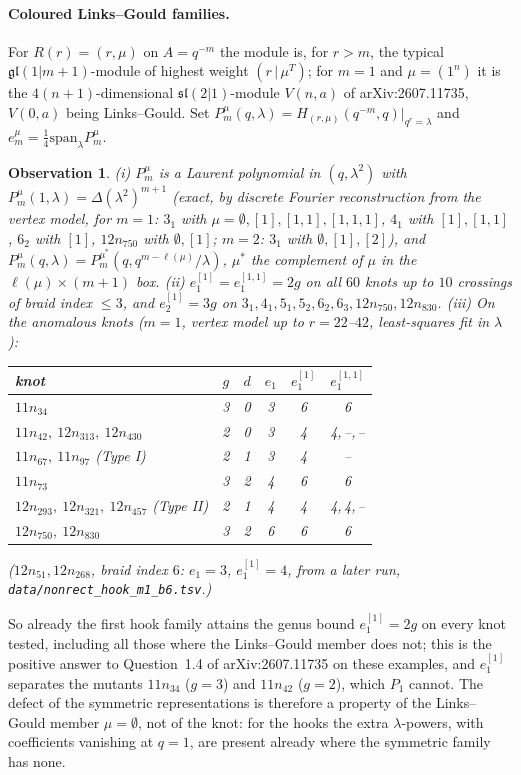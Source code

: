 \documentclass[11pt]{article}
\newtheorem{observation}{Observation}
\theoremstyle{definition}
\theoremstyle{remark}
\begin{document}
\paragraph{Coloured Links--Gould families.}  For $R(r)=(r,\mu)$ on $A=q^{-m}$ the module is, for $r>m$, the typical
$\mathfrak{gl}(1|m+1)$-module of highest weight $(r\,|\,\mu^T)$; for $m=1$ and $\mu=(1^n)$ it is the
$4(n+1)$-dimensional $\mathfrak{sl}(2|1)$-module $V(n,a)$ of arXiv:2607.11735, $V(0,a)$ being Links--Gould.  Set
$P^\mu_m(q,\lambda)=H_{(r,\mu)}(q^{-m},q)|_{q^r=\lambda}$ and $e^\mu_m=\frac14\mathrm{span}_\lambda P^\mu_m$.
\begin{observation}\label{obs:hooks}
(i) $P^\mu_m$ is a Laurent polynomial in $(q,\lambda^2)$ with $P^\mu_m(1,\lambda)=\Delta(\lambda^2)^{m+1}$
(exact, by discrete Fourier reconstruction from the vertex model, for $m=1$: $3_1$ with $\mu=\emptyset,[1],[1,1],[1,1,1]$,
$4_1$ with $[1],[1,1]$, $6_2$ with $[1]$, $12n_{750}$ with $\emptyset,[1]$; $m=2$: $3_1$ with $\emptyset,[1],[2]$),
and $P^\mu_m(q,\lambda)=P^{\mu^*}_m(q,q^{m-\ell(\mu)}/\lambda)$, $\mu^*$ the complement of $\mu$ in the
$\ell(\mu)\times(m+1)$ box.
(ii) $e^{[1]}_1=e^{[1,1]}_1=2g$ on all $60$ knots up to $10$ crossings of braid index $\le3$, and $e^{[1]}_2=3g$ on
$3_1,4_1,5_1,5_2,6_2,6_3,12n_{750},12n_{830}$.
(iii) On the anomalous knots ($m=1$, vertex model up to $r=22$--$42$, least-squares fit in $\lambda$):
\begin{center}
\begin{tabular}{lccccc}
\toprule
knot & $g$ & $d$ & $e_1$ & $e^{[1]}_1$ & $e^{[1,1]}_1$\\
\midrule
$11n_{34}$ & 3 & 0 & 3 & 6 & 6\\
$11n_{42},\ 12n_{313},\ 12n_{430}$ & 2 & 0 & 3 & 4 & 4,\,--,\,--\\
$11n_{67},\ 11n_{97}$ (Type I) & 2 & 1 & 3 & 4 & --\\
$11n_{73}$ & 3 & 2 & 4 & 6 & 6\\
$12n_{293},\ 12n_{321},\ 12n_{457}$ (Type II) & 2 & 1 & 4 & 4 & 4,\,4,\,--\\
$12n_{750},\ 12n_{830}$ & 3 & 2 & 6 & 6 & 6\\
\bottomrule
\end{tabular}
\end{center}
($12n_{51},12n_{268}$, braid index $6$: $e_1=3$, $e^{[1]}_1=4$, from a later run, \texttt{data/nonrect\_hook\_m1\_b6.tsv}.)
\end{observation}
So already the first hook family attains the genus bound $e^{[1]}_1=2g$ on every knot tested, including all those
where the Links--Gould member does not; this is the positive answer to Question~1.4 of arXiv:2607.11735 on these
examples, and $e^{[1]}_1$ separates the mutants $11n_{34}$ ($g=3$) and $11n_{42}$ ($g=2$), which $P_1$ cannot.
The defect of the symmetric representations is therefore a property of the Links--Gould member $\mu=\emptyset$,
not of the knot: for the hooks the extra $\lambda$-powers, with coefficients vanishing at $q=1$, are present already
where the symmetric family has none.
\end{document}
